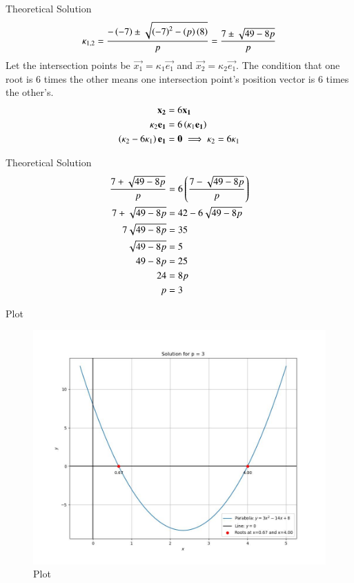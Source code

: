 \documentclass{beamer}
\begin{document}
\begin{frame}{Theoretical Solution}
\begin{align}
    \kappa_{1,2} = \frac{-\left(-7\right) \pm \sqrt{\left(-7\right)^2 - \left(p\right)\left(8\right)}}{p} = \frac{7 \pm \sqrt{49-8p}}{p}
\end{align} 
Let the intersection points be $\vec{x_1} = \kappa_1\vec{e_1}$ and $\vec{x_2} = \kappa_2\vec{e_1}$.
The condition that one root is 6 times the other means one intersection point's position vector is 6 times the other's.
\begin{align}
    \mathbf{x_2} &= 6\mathbf{x_1} \\
    \kappa_2\mathbf{e_1} &= 6\left(\kappa_1\mathbf{e_1}\right) \\
    \left(\kappa_2 - 6\kappa_1\right)\mathbf{e_1} &= \mathbf{0} \implies \kappa_2 = 6\kappa_1
\end{align}
\end{frame}

\begin{frame}{Theoretical Solution}
\begin{align}
    \frac{7 + \sqrt{49-8p}}{p} &= 6\left(\frac{7 - \sqrt{49-8p}}{p}\right) \\
    7 + \sqrt{49-8p} &= 42 - 6\sqrt{49-8p} \\
    7\sqrt{49-8p} &= 35 \\
    \sqrt{49-8p} &= 5 \\
    49-8p &= 25 \\
    24 &= 8p \\
    p &= 3
\end{align}
\end{frame}

\begin{frame}{Plot}
\begin{figure}
	\centering
	\includegraphics[width=0.5\columnwidth]{../figs/plot_c.jpg}
	\caption{Plot}
	\label{fig:fig}
\end{figure}
\end{frame}
\end{document}
